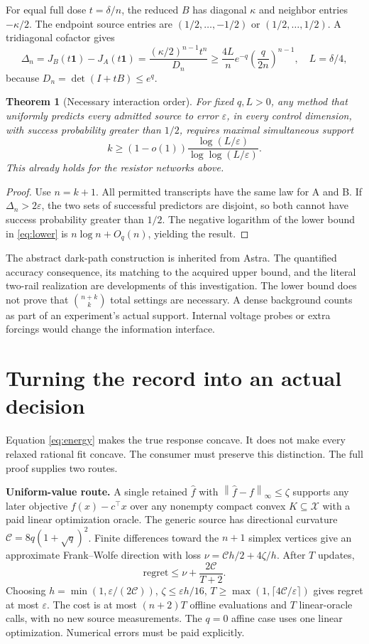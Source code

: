 \documentclass[10pt,a4paper]{article}
\newtheorem{theorem}{Theorem}
\newcommand{\X}{\mathcal X}
\newcommand{\eps}{\varepsilon}
\newcommand{\norm}[1]{\left\lVert#1\right\rVert}
\begin{document}
For equal full dose $t=\delta/n$, the reduced $B$ has diagonal $\kappa$ and
neighbor entries $-\kappa/2$. The endpoint source entries are
$(1/2,\ldots,-1/2)$ or $(1/2,\ldots,1/2)$. A tridiagonal cofactor gives
\begin{equation}
 \Delta_n=J_B(t\mathbf1)-J_A(t\mathbf1)
  =\frac{(\kappa/2)^{n-1}t^n}{D_n}
  \ge\frac{4L}{n}e^{-q}\left(\frac{q}{2n}\right)^{n-1},
 \quad L=\delta/4,
 \label{eq:lower}
\end{equation}
because $D_n=\det(I+tB)\le e^q$.

\begin{theorem}[Necessary interaction order]
For fixed $q,L>0$, any method that uniformly predicts every admitted source to
error $\eps$, in every control dimension, with success probability greater than
$1/2$, requires maximal simultaneous support
\[
 k\ge(1-o(1))\frac{\log(L/\eps)}{\log\log(L/\eps)}.
\]
This already holds for the resistor networks above.
\end{theorem}
\begin{proof}
Use $n=k+1$. All permitted transcripts have the same law for A and B. If
$\Delta_n>2\eps$, the two sets of successful predictors are disjoint, so both
cannot have success probability greater than $1/2$. The negative logarithm of
the lower bound in \eqref{eq:lower} is $n\log n+O_q(n)$, yielding the result.
\end{proof}

The abstract dark-path construction is inherited from Astra. The quantified
accuracy consequence, its matching to the acquired upper bound, and the literal
two-rail realization are developments of this investigation. The lower bound
does not prove that $\binom{n+k}{k}$ total settings are necessary. A dense
background counts as part of an experiment's actual support. Internal voltage
probes or extra forcings would change the information interface.

\section{Turning the record into an actual decision}

Equation \eqref{eq:energy} makes the true response concave. It does not make
every relaxed rational fit concave. The consumer must preserve this distinction.
The full proof supplies two routes.

\textbf{Uniform-value route.} A single retained $\widehat f$ with
$\norm{\widehat f-f}_\infty\le\zeta$ supports any later objective
$f(x)-c^\top x$ over any nonempty compact convex $K\subseteq\X$ with a paid
linear optimization oracle. The generic source has directional curvature
$\mathcal C=8q(1+\sqrt q)^2$. Finite differences toward the $n+1$ simplex
vertices give an approximate Frank--Wolfe direction with loss
$\nu=\mathcal C h/2+4\zeta/h$. After $T$ updates,
\[
 \mathrm{regret}\le\nu+\frac{2\mathcal C}{T+2}.
\]
Choosing $h=\min(1,\eps/(2\mathcal C))$,
$\zeta\le\eps h/16$, $T\ge\max(1,\lceil4\mathcal C/\eps\rceil)$ gives
regret at most $\eps$. The cost is at most $(n+2)T$ offline evaluations and
$T$ linear-oracle calls, with no new source measurements. The $q=0$ affine
case uses one linear optimization. Numerical errors must be paid explicitly.
\end{document}
